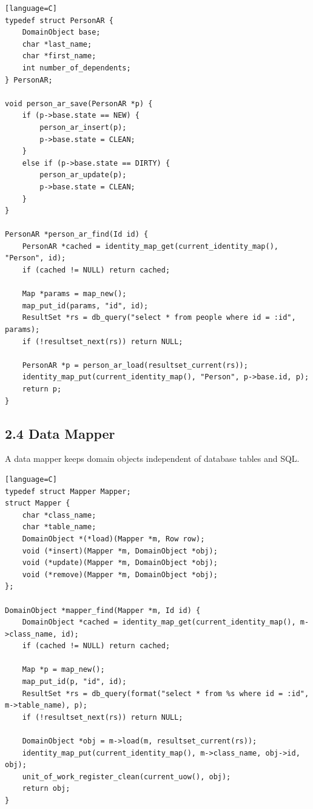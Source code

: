 \documentclass[11pt]{article}
\begin{document}
\begin{verbatim}[language=C]
typedef struct PersonAR {
    DomainObject base;
    char *last_name;
    char *first_name;
    int number_of_dependents;
} PersonAR;

void person_ar_save(PersonAR *p) {
    if (p->base.state == NEW) {
        person_ar_insert(p);
        p->base.state = CLEAN;
    }
    else if (p->base.state == DIRTY) {
        person_ar_update(p);
        p->base.state = CLEAN;
    }
}

PersonAR *person_ar_find(Id id) {
    PersonAR *cached = identity_map_get(current_identity_map(), "Person", id);
    if (cached != NULL) return cached;

    Map *params = map_new();
    map_put_id(params, "id", id);
    ResultSet *rs = db_query("select * from people where id = :id", params);
    if (!resultset_next(rs)) return NULL;

    PersonAR *p = person_ar_load(resultset_current(rs));
    identity_map_put(current_identity_map(), "Person", p->base.id, p);
    return p;
}
\end{verbatim}

\subsection{2.4 Data Mapper}\label{data-mapper}

A data mapper keeps domain objects independent of database tables and
SQL.

\begin{verbatim}[language=C]
typedef struct Mapper Mapper;
struct Mapper {
    char *class_name;
    char *table_name;
    DomainObject *(*load)(Mapper *m, Row row);
    void (*insert)(Mapper *m, DomainObject *obj);
    void (*update)(Mapper *m, DomainObject *obj);
    void (*remove)(Mapper *m, DomainObject *obj);
};

DomainObject *mapper_find(Mapper *m, Id id) {
    DomainObject *cached = identity_map_get(current_identity_map(), m->class_name, id);
    if (cached != NULL) return cached;

    Map *p = map_new();
    map_put_id(p, "id", id);
    ResultSet *rs = db_query(format("select * from %s where id = :id", m->table_name), p);
    if (!resultset_next(rs)) return NULL;

    DomainObject *obj = m->load(m, resultset_current(rs));
    identity_map_put(current_identity_map(), m->class_name, obj->id, obj);
    unit_of_work_register_clean(current_uow(), obj);
    return obj;
}
\end{verbatim}
\end{document}
